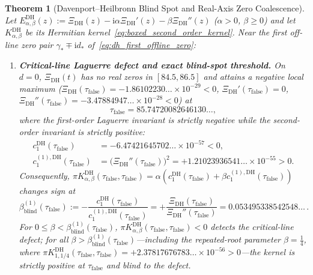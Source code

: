 \documentclass[11pt,reqno]{amsart}
\newtheorem{theorem}{Theorem}[section]
\theoremstyle{definition}
\theoremstyle{remark}
\numberwithin{equation}{section}
\newcommand{\ii}{\mathrm{i}}
\begin{document}
\begin{theorem}[Davenport--Heilbronn Blind Spot and Real-Axis Zero Coalescence]\label{thm:dh_blind_spot}
Let $E_{\alpha,\beta}^{\mathrm{DH}}(z) := \Xi_{\mathrm{DH}}(z) - \ii\alpha\Xi_{\mathrm{DH}}'(z) - \beta\Xi_{\mathrm{DH}}''(z)$ ($\alpha > 0$, $\beta \ge 0$) and let $K_{\alpha,\beta}^{\mathrm{DH}}$ be its Hermitian kernel~\eqref{eq:boxed_second_order_kernel}. Near the first off-line zero pair $\gamma_* \mp \ii d_*$ of~\eqref{eq:dh_first_offline_zero}:
\begin{enumerate}[label=\textup{(\roman*)},leftmargin=2.2em]
\item \textbf{Critical-line Laguerre defect and exact blind-spot threshold.} On $d = 0$, $\Xi_{\mathrm{DH}}(t)$ has no real zeros in $[84.5, 86.5]$ and attains a negative local maximum ($\Xi_{\mathrm{DH}}(\tau_{\mathrm{false}}) = -1.86102230\ldots \times 10^{-29} < 0$, $\Xi_{\mathrm{DH}}'(\tau_{\mathrm{false}}) = 0$, $\Xi_{\mathrm{DH}}''(\tau_{\mathrm{false}}) = -3.47884947\ldots \times 10^{-28} < 0$) at
\begin{equation}\label{eq:tau_false_dh}
\tau_{\mathrm{false}} = 85.74720082646130\ldots,
\end{equation}
where the first-order Laguerre invariant is strictly negative while the second-order invariant is strictly positive:
\begin{equation}\label{eq:c1_dh_values}
\begin{aligned}
c_1^{\mathrm{DH}}(\tau_{\mathrm{false}}) &= -6.47421645702\ldots \times 10^{-57} < 0, \\
c_1^{(1),\mathrm{DH}}(\tau_{\mathrm{false}}) &= \bigl(\Xi_{\mathrm{DH}}''(\tau_{\mathrm{false}})\bigr)^2 = +1.21023936541\ldots \times 10^{-55} > 0.
\end{aligned}
\end{equation}
Consequently, $\pi K_{\alpha,\beta}^{\mathrm{DH}}(\tau_{\mathrm{false}}, \tau_{\mathrm{false}}) = \alpha(c_1^{\mathrm{DH}}(\tau_{\mathrm{false}}) + \beta c_1^{(1),\mathrm{DH}}(\tau_{\mathrm{false}}))$ changes sign at
\begin{equation}\label{eq:beta_blind_dh}
\beta_{\mathrm{blind}}^{(1)}(\tau_{\mathrm{false}}) := -\frac{c_1^{\mathrm{DH}}(\tau_{\mathrm{false}})}{c_1^{(1),\mathrm{DH}}(\tau_{\mathrm{false}})} = +\frac{\Xi_{\mathrm{DH}}(\tau_{\mathrm{false}})}{\Xi_{\mathrm{DH}}''(\tau_{\mathrm{false}})} = 0.053495338542548\ldots\,.
\end{equation}
For $0 \le \beta < \beta_{\mathrm{blind}}^{(1)}(\tau_{\mathrm{false}})$, $\pi K_{\alpha,\beta}^{\mathrm{DH}}(\tau_{\mathrm{false}}, \tau_{\mathrm{false}}) < 0$ detects the critical-line defect; for all $\beta > \beta_{\mathrm{blind}}^{(1)}(\tau_{\mathrm{false}})$---including the repeated-root parameter $\beta = \frac{1}{4}$, where $\pi K_{1,1/4}^{\mathrm{DH}}(\tau_{\mathrm{false}}, \tau_{\mathrm{false}}) = +2.37817676783\ldots \times 10^{-56} > 0$---the kernel is strictly positive at $\tau_{\mathrm{false}}$ and blind to the defect.

\end{enumerate}
\end{theorem}
\end{document}

